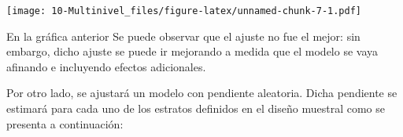 \documentclass[
  12pt,
]{book}
\newenvironment{Shaded}{\begin{snugshade}}{\end{snugshade}}
\newcommand{\AttributeTok}[1]{\textcolor[rgb]{0.77,0.63,0.00}{#1}}
\newcommand{\FloatTok}[1]{\textcolor[rgb]{0.00,0.00,0.81}{#1}}
\newcommand{\FunctionTok}[1]{\textcolor[rgb]{0.00,0.00,0.00}{#1}}
\newcommand{\NormalTok}[1]{#1}
\newcommand{\SpecialCharTok}[1]{\textcolor[rgb]{0.00,0.00,0.00}{#1}}
\newcommand{\StringTok}[1]{\textcolor[rgb]{0.31,0.60,0.02}{#1}}
\begin{document}
\begin{Shaded}
\end{Shaded}

\texttt{[image: 10-Multinivel\_files/figure-latex/unnamed-chunk-7-1.pdf]}

En la gráfica anterior Se puede observar que el ajuste no fue el mejor: sin embargo, dicho ajuste se puede ir mejorando a medida que el modelo se vaya afinando e incluyendo efectos adicionales.

Por otro lado, se ajustará un modelo con pendiente aleatoria. Dicha pendiente se estimará para cada uno de los estratos definidos en el diseño muestral como se presenta a continuación:
\end{document}
